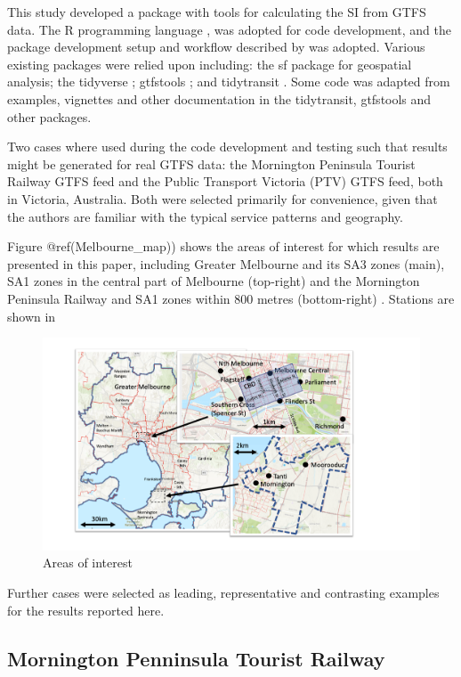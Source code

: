 \documentclass[preprint, 3p,
authoryear]{elsarticle} %
\begin{document}
This study developed a package with tools for calculating the SI from
GTFS data. The R programming language \citep{R-base}, was adopted for
code development, and the package development setup and workflow
described by \citet{wickham2023r} was adopted. Various existing packages
were relied upon including: the sf package \citep{R-sf} for geospatial
analysis; the tidyverse \citep{tidyverse2019}; gtfstools
\citep{R-gtfstools}; and tidytransit \citep{R-tidytransit}. Some code
was adapted from examples, vignettes and other documentation in the
tidytransit, gtfstools and other packages.

Two cases where used during the code development and testing such that
results might be generated for real GTFS data: the Mornington Peninsula
Tourist Railway GTFS feed and the Public Transport Victoria (PTV) GTFS
feed, both in Victoria, Australia. Both were selected primarily for
convenience, given that the authors are familiar with the typical
service patterns and geography.

Figure @ref(Melbourne\_map)) shows the areas of interest for which
results are presented in this paper, including Greater Melbourne and its
SA3 zones (main), SA1 zones in the central part of Melbourne (top-right)
and the Mornington Peninsula Railway and SA1 zones within 800 metres
(bottom-right) . Stations are shown in

\begin{figure}
\includegraphics[width=1\linewidth]{graphics/all_maps} \caption{Areas of interest}\label{fig:Melbourne_map}
\end{figure}

Further cases were selected as leading, representative and contrasting
examples for the results reported here.

\hypertarget{mornington-penninsula-tourist-railway}{%
\subsection{Mornington Penninsula Tourist
Railway}\label{mornington-penninsula-tourist-railway}}
\end{document}
